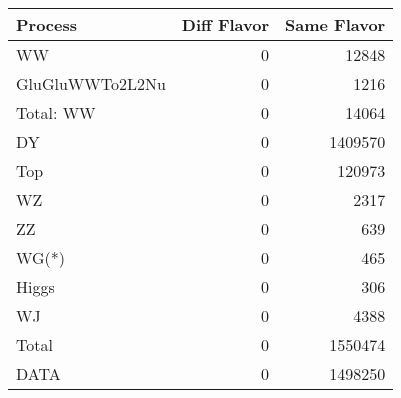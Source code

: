 \begin{table}[ht]
	\centering
\begin{tabular}{lrr}

         Process &  Diff Flavor &  Same Flavor \\
		\hline
              WW &            0 &        12848 \\
 GluGluWWTo2L2Nu &            0 &         1216 \\
\hline
       Total: WW &            0 &        14064 \\
              DY &            0 &      1409570 \\
             Top &            0 &       120973 \\
              WZ &            0 &         2317 \\
              ZZ &            0 &          639 \\
           WG(*) &            0 &          465 \\
           Higgs &            0 &          306 \\
              WJ &            0 &         4388 \\
\hline
           Total &            0 &      1550474 \\
            DATA &            0 &      1498250 \\


\end{tabular}

\end{table}
